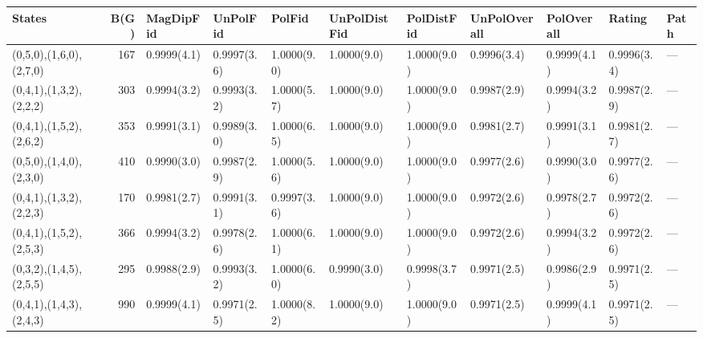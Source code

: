 \begin{tabular}{lrlllllllll}
\hline
 States                  &   B(G) & MagDipFid   & UnPolFid    & PolFid      & UnPolDistFid   & PolDistFid   & UnPolOverall   & PolOverall   & Rating      & Path   \\
\hline
 (0,5,0),(1,6,0),(2,7,0) &    167 & 0.9999(4.1) & 0.9997(3.6) & 1.0000(9.0) & 1.0000(9.0)    & 1.0000(9.0)  & 0.9996(3.4)    & 0.9999(4.1)  & 0.9996(3.4) & ---    \\
 (0,4,1),(1,3,2),(2,2,2) &    303 & 0.9994(3.2) & 0.9993(3.2) & 1.0000(5.7) & 1.0000(9.0)    & 1.0000(9.0)  & 0.9987(2.9)    & 0.9994(3.2)  & 0.9987(2.9) & ---    \\
 (0,4,1),(1,5,2),(2,6,2) &    353 & 0.9991(3.1) & 0.9989(3.0) & 1.0000(6.5) & 1.0000(9.0)    & 1.0000(9.0)  & 0.9981(2.7)    & 0.9991(3.1)  & 0.9981(2.7) & ---    \\
 (0,5,0),(1,4,0),(2,3,0) &    410 & 0.9990(3.0) & 0.9987(2.9) & 1.0000(5.6) & 1.0000(9.0)    & 1.0000(9.0)  & 0.9977(2.6)    & 0.9990(3.0)  & 0.9977(2.6) & ---    \\
 (0,4,1),(1,3,2),(2,2,3) &    170 & 0.9981(2.7) & 0.9991(3.1) & 0.9997(3.6) & 1.0000(9.0)    & 1.0000(9.0)  & 0.9972(2.6)    & 0.9978(2.7)  & 0.9972(2.6) & ---    \\
 (0,4,1),(1,5,2),(2,5,3) &    366 & 0.9994(3.2) & 0.9978(2.6) & 1.0000(6.1) & 1.0000(9.0)    & 1.0000(9.0)  & 0.9972(2.6)    & 0.9994(3.2)  & 0.9972(2.6) & ---    \\
 (0,3,2),(1,4,5),(2,5,5) &    295 & 0.9988(2.9) & 0.9993(3.2) & 1.0000(6.0) & 0.9990(3.0)    & 0.9998(3.7)  & 0.9971(2.5)    & 0.9986(2.9)  & 0.9971(2.5) & ---    \\
 (0,4,1),(1,4,3),(2,4,3) &    990 & 0.9999(4.1) & 0.9971(2.5) & 1.0000(8.2) & 1.0000(9.0)    & 1.0000(9.0)  & 0.9971(2.5)    & 0.9999(4.1)  & 0.9971(2.5) & ---    \\
\hline
\end{tabular}